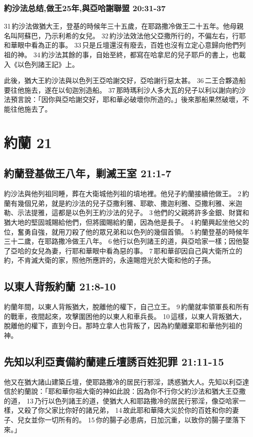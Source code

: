\subsubsection{約沙法总结,做王25年,與亞哈謝聯盟 20:31-37}
31 約沙法做猶大王，登基的時候年三十五歲，在耶路撒冷做王二十五年。他母親名叫阿蘇巴，乃示利希的女兒。 32 約沙法效法他父亞撒所行的，不偏左右，行耶和華眼中看為正的事。 33 只是丘壇還沒有廢去，百姓也沒有立定心意歸向他們列祖的神。 34 約沙法其餘的事，自始至終，都寫在哈拿尼的兒子耶戶的書上，也載入《以色列諸王記》上。

此後，猶大王約沙法與以色列王亞哈謝交好，亞哈謝行惡太甚。 36 二王合夥造船要往他施去，遂在以旬迦別造船。 37 那時瑪利沙人多大瓦的兒子以利以謝向約沙法預言說：「因你與亞哈謝交好，耶和華必破壞你所造的。」後來那船果然破壞，不能往他施去了。


\section{約蘭 21 }
\subsection{約蘭登基做王八年，剿滅王室 21:1-7}
約沙法與他列祖同睡，葬在大衛城他列祖的墳地裡。他兒子約蘭接續他做王。 2 約蘭有幾個兄弟，就是約沙法的兒子亞撒利雅、耶歇、撒迦利雅、亞撒利雅、米迦勒、示法提雅，這都是以色列王約沙法的兒子。 3 他們的父親將許多金銀、財寶和猶大地的堅固城賜給他們，但將國賜給約蘭，因為他是長子。 4 約蘭興起坐他父的位，奮勇自強，就用刀殺了他的眾兄弟和以色列的幾個首領。 5 約蘭登基的時候年三十二歲，在耶路撒冷做王八年。 6 他行以色列諸王的道，與亞哈家一樣；因他娶了亞哈的女兒為妻，行耶和華眼中看為惡的事。 7 耶和華卻因自己與大衛所立的約，不肯滅大衛的家，照他所應許的，永遠賜燈光於大衛和他的子孫。

\subsection{以東人背叛約蘭 21:8-10}
約蘭年間，以東人背叛猶大，脫離他的權下，自己立王。 9 約蘭就率領軍長和所有的戰車，夜間起來，攻擊圍困他的以東人和車兵長。 10 這樣，以東人背叛猶大，脫離他的權下，直到今日。那時立拿人也背叛了，因為約蘭離棄耶和華他列祖的神。

\subsection{先知以利亞責備約蘭建丘壇誘百姓犯罪 21:11-15}
他又在猶大諸山建築丘壇，使耶路撒冷的居民行邪淫，誘惑猶大人。先知以利亞達信於約蘭說：「耶和華你祖大衛的神如此說：因為你不行你父約沙法和猶大王亞撒的道， 13 乃行以色列諸王的道，使猶大人和耶路撒冷的居民行邪淫，像亞哈家一樣，又殺了你父家比你好的諸兄弟， 14 故此耶和華降大災於你的百姓和你的妻子、兒女並你一切所有的。 15 你的腸子必患病，日加沉重，以致你的腸子墜落下來。」

